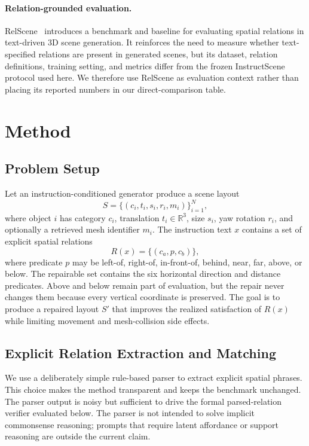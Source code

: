 \documentclass{egpubl}
\begin{document}
\paragraph*{Relation-grounded evaluation.}
RelScene~\cite{ye2024relscene} introduces a benchmark and baseline for evaluating spatial relations in text-driven 3D scene generation. It reinforces the need to measure whether text-specified relations are present in generated scenes, but its dataset, relation definitions, training setting, and metrics differ from the frozen InstructScene protocol used here. We therefore use RelScene as evaluation context rather than placing its reported numbers in our direct-comparison table.

\section{Method}

\subsection{Problem Setup}

Let an instruction-conditioned generator produce a scene layout
\[
  S = \{(c_i, t_i, s_i, r_i, m_i)\}_{i=1}^{N},
\]
where object $i$ has category $c_i$, translation $t_i \in \mathbb{R}^{3}$, size $s_i$, yaw rotation $r_i$, and optionally a retrieved mesh identifier $m_i$. The instruction text $x$ contains a set of explicit spatial relations
\[
  R(x) = \{(c_a, p, c_b)\},
\]
where predicate $p$ may be left-of, right-of, in-front-of, behind, near, far, above, or below. The repairable set contains the six horizontal direction and distance predicates. Above and below remain part of evaluation, but the repair never changes them because every vertical coordinate is preserved. The goal is to produce a repaired layout $S'$ that improves the realized satisfaction of $R(x)$ while limiting movement and mesh-collision side effects.

\subsection{Explicit Relation Extraction and Matching}

We use a deliberately simple rule-based parser to extract explicit spatial phrases. This choice makes the method transparent and keeps the benchmark unchanged. The parser output is noisy but sufficient to drive the formal parsed-relation verifier evaluated below. The parser is not intended to solve implicit commonsense reasoning; prompts that require latent affordance or support reasoning are outside the current claim.
\end{document}
